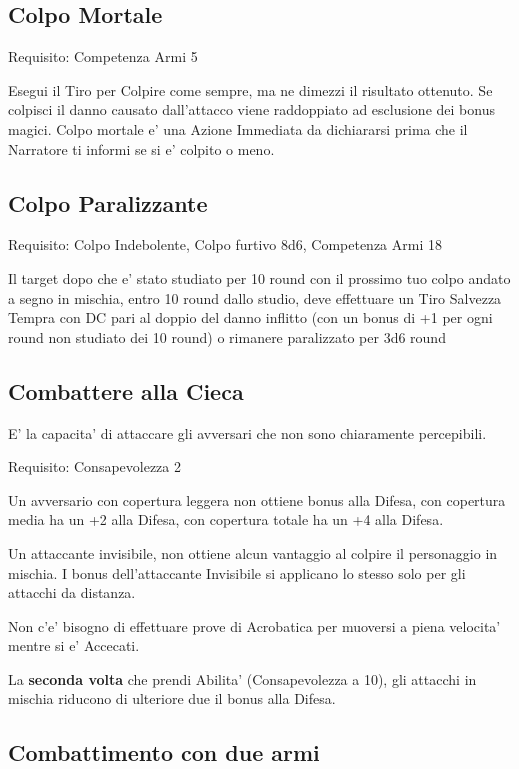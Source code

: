 \documentclass[a4paper,11pt,twoside,openany]{book}
\begin{document}
\subsection{Colpo Mortale}

Requisito: Competenza Armi 5

Esegui il Tiro per Colpire come sempre, ma ne dimezzi il risultato ottenuto. Se colpisci il danno causato dall'attacco viene raddoppiato ad esclusione dei bonus magici. Colpo mortale e' una Azione Immediata da dichiararsi prima che il Narratore ti informi se si e' colpito o meno.

\subsection{Colpo Paralizzante}

Requisito: Colpo Indebolente, Colpo furtivo 8d6, Competenza Armi 18

Il target dopo che e' stato studiato per 10 round con il prossimo tuo colpo andato a segno in mischia, entro 10 round dallo studio, deve effettuare un Tiro Salvezza Tempra con DC pari al doppio del danno inflitto (con un bonus di +1 per ogni round non studiato dei 10 round) o rimanere paralizzato per 3d6 round

\subsection{Combattere alla Cieca}

E' la capacita' di attaccare gli avversari che non sono chiaramente percepibili.

Requisito: Consapevolezza 2

Un avversario con copertura leggera non ottiene bonus alla Difesa, con copertura media ha un +2 alla Difesa, con copertura totale ha un +4 alla Difesa.

Un attaccante invisibile, non ottiene alcun vantaggio al colpire il personaggio in mischia. I bonus dell'attaccante Invisibile si applicano lo stesso solo per gli attacchi da distanza.

Non c'e' bisogno di effettuare prove di Acrobatica per muoversi a piena velocita' mentre si e' Accecati.

La \textbf{seconda volta} che prendi Abilita' (Consapevolezza a 10), gli attacchi in mischia riducono di ulteriore due il bonus alla Difesa.

\subsection{Combattimento con due armi}
\end{document}
